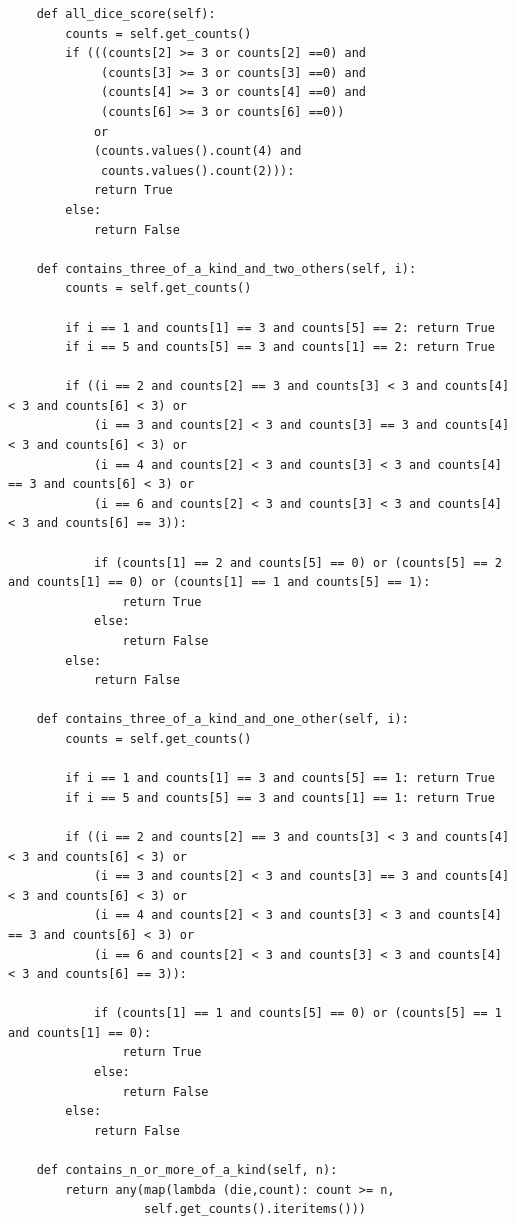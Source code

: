 \documentclass{article}
\begin{document}
\begin{verbatim}
    def all_dice_score(self):
        counts = self.get_counts()
        if (((counts[2] >= 3 or counts[2] ==0) and
             (counts[3] >= 3 or counts[3] ==0) and
             (counts[4] >= 3 or counts[4] ==0) and
             (counts[6] >= 3 or counts[6] ==0))
            or
            (counts.values().count(4) and
             counts.values().count(2))):
            return True
        else:
            return False

    def contains_three_of_a_kind_and_two_others(self, i):
        counts = self.get_counts()

        if i == 1 and counts[1] == 3 and counts[5] == 2: return True
        if i == 5 and counts[5] == 3 and counts[1] == 2: return True

        if ((i == 2 and counts[2] == 3 and counts[3] < 3 and counts[4] < 3 and counts[6] < 3) or
            (i == 3 and counts[2] < 3 and counts[3] == 3 and counts[4] < 3 and counts[6] < 3) or
            (i == 4 and counts[2] < 3 and counts[3] < 3 and counts[4] == 3 and counts[6] < 3) or
            (i == 6 and counts[2] < 3 and counts[3] < 3 and counts[4] < 3 and counts[6] == 3)):

            if (counts[1] == 2 and counts[5] == 0) or (counts[5] == 2 and counts[1] == 0) or (counts[1] == 1 and counts[5] == 1):
                return True
            else:
                return False
        else:
            return False

    def contains_three_of_a_kind_and_one_other(self, i):
        counts = self.get_counts()

        if i == 1 and counts[1] == 3 and counts[5] == 1: return True
        if i == 5 and counts[5] == 3 and counts[1] == 1: return True

        if ((i == 2 and counts[2] == 3 and counts[3] < 3 and counts[4] < 3 and counts[6] < 3) or
            (i == 3 and counts[2] < 3 and counts[3] == 3 and counts[4] < 3 and counts[6] < 3) or
            (i == 4 and counts[2] < 3 and counts[3] < 3 and counts[4] == 3 and counts[6] < 3) or
            (i == 6 and counts[2] < 3 and counts[3] < 3 and counts[4] < 3 and counts[6] == 3)):

            if (counts[1] == 1 and counts[5] == 0) or (counts[5] == 1 and counts[1] == 0):
                return True
            else:
                return False
        else:
            return False

    def contains_n_or_more_of_a_kind(self, n):
        return any(map(lambda (die,count): count >= n,
                   self.get_counts().iteritems()))


\end{verbatim}
\end{document}
